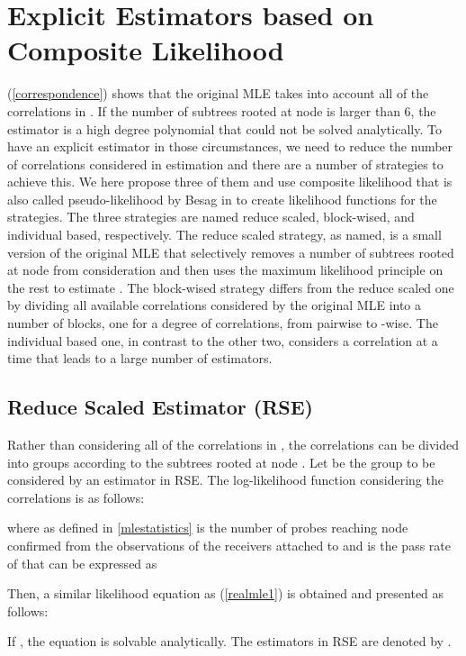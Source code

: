 \documentclass[10pt,onecolumn]{IEEEtran}
\begin{document}
\section{Explicit Estimators based on Composite Likelihood} \label{section 4}
(\ref{correspondence}) shows that the original MLE takes into account all of the correlations in . If the number of subtrees rooted at node  is larger than 6, the estimator is a high degree polynomial that could not be solved analytically. To have an explicit estimator in those circumstances, we need to reduce the number of correlations considered in estimation and there are a number of strategies to achieve this. We here propose three of them and use composite likelihood that  is also called
pseudo-likelihood by Besag in \cite{Besay74} to create likelihood functions for the strategies. The three strategies are named  reduce scaled, block-wised, and individual based, respectively. The reduce scaled strategy, as named, is a small version of the original MLE that selectively removes a  number of subtrees rooted at node  from consideration and then uses the maximum likelihood principle on the rest to estimate . The block-wised strategy differs from the reduce scaled one by dividing all available correlations considered by the original MLE into a number of blocks, one for a degree of correlations, from pairwise to -wise. The individual based one,  in contrast to the other two, considers a correlation at a time that leads to a large number of estimators.

\subsection{Reduce Scaled Estimator (RSE)}

Rather than considering all of the correlations in , the correlations can be divided into groups according to the subtrees rooted at node . Let  be the group to be considered by an estimator in RSE. The log-likelihood function considering the correlations  is as follows:
 
 where  as defined in \ref{mlestatistics} is the number of probes reaching node  confirmed from the observations of the receivers attached to  and
  is the pass rate of   that can be expressed as

Then, a similar likelihood equation as (\ref{realmle1}) is obtained and presented as follows:

If , the equation is solvable analytically. The estimators in RSE are denoted by .
\end{document}
